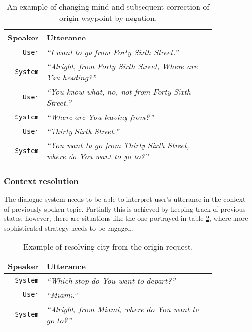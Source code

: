 \begin{table}[h]
\centering
\begin{tabular}{ | r | p{0.85\linewidth} | } \hline
	\textbf{Speaker} & \textbf{Utterance} \\ \hline
	\texttt{User} & \textit{``I want to go from Forty Sixth Street.''} \\ \hline
	\texttt{System} & \textit{``Alright, from Forty Sixth Street, Where are You heading?''} \\ \hline	
	\texttt{User} & \textit{``You know what, no, not from Forty Sixth Street.''} \\ \hline
	\texttt{System} & \textit{``Where are You leaving from?''} \\ \hline
	\texttt{User} & \textit{``Thirty Sixth Street.''} \\ \hline
	\texttt{System} & \textit{``You want to go from Thirty Sixth Street, where do You want to go to?''} \\ \hline
\end{tabular}
\caption[Changing input by negation]{An example of changing mind and subsequent correction of origin waypoint by negation.}
\label{table:negation}
\end{table}

\subsubsection{Context resolution}

The dialogue system needs to be able to interpret user's utterance in the context of previously spoken topic.
Partially this is achieved by keeping track of previous states, however, there are situations like the one portrayed in table \ref{table:cr}, where more sophisticated strategy needs to be engaged.

\begin{table}[h]
\centering
\begin{tabular}{ | r | p{0.85\linewidth} | } \hline
	\textbf{Speaker} & \textbf{Utterance} \\ \hline
	\texttt{System} & \textit{``Which stop do You want to depart?''} \\ \hline
	\texttt{User} & \textit{``Miami.}'' \\ \hline
	\texttt{System} & \textit{``Alright, from Miami, where do You want to go to?''} \\ \hline
\end{tabular}
\caption[Context resolution of origin waypoint]{Example of resolving city from the origin request.}
\label{table:cr}
\end{table}


